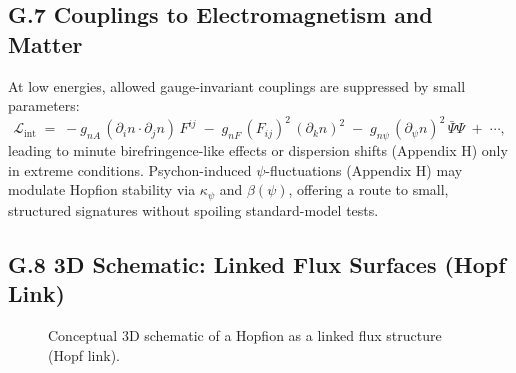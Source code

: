 \documentclass[12pt,a4paper]{article}
\numberwithin{equation}{section}
\theoremstyle{definition}
\theoremstyle{remark}
\begin{document}
\subsection*{G.7 Couplings to Electromagnetism and Matter}
At low energies, allowed gauge-invariant couplings are suppressed by small parameters:
\begin{equation}
\mathcal{L}_{\mathrm{int}} \;=\; - g_{nA}\, ( \partial_i n \cdot \partial_j n )\, F^{ij} \;-\; g_{nF}\, (F_{ij})^2\, ( \partial_k n )^2 \;-\; g_{n\psi}\, (\partial_\psi n)^2\, \bar{\Psi}\Psi \;+\; \cdots,
\end{equation}
leading to minute birefringence-like effects or dispersion shifts (Appendix H) only in extreme conditions. 
Psychon-induced $\psi$-fluctuations (Appendix H) may modulate Hopfion stability via $\kappa_\psi$ and $\beta(\psi)$, offering a route to small, structured signatures without spoiling standard-model tests.

\subsection*{G.8 3D Schematic: Linked Flux Surfaces (Hopf Link)}
\begin{figure}[h!]
\centering
{}
\caption{Conceptual 3D schematic of a Hopfion as a linked flux structure (Hopf link).}
\label{fig:hopf_link}
\end{figure}
\end{document}
